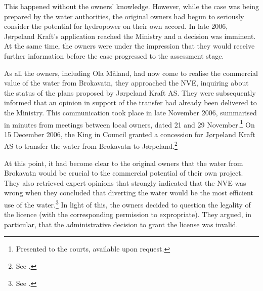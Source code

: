 This happened without the owners' knowledge. However, while the case was being prepared by the water authorities, the original owners had begun to seriously consider the potential for hydropower on their own accord. In late 2006, Jørpeland Kraft's application reached the Ministry and a decision was imminent. At the same time, the owners were under the impression that they would receive further information before the case progressed to the assessment stage.

As all the owners, including Ola Måland, had now come to realise the commercial value of the water from Brokavatn, they approached the NVE, inquiring about the status of the plans proposed by Jørpeland Kraft AS. They were subsequently informed that an opinion in support of the transfer had already been delivered to the Ministry. This communication took place in late November 2006, summarised in minutes from meetings between local owners, dated 21 and 29 November.\footnote{Presented to the courts, available upon request.} On 15 December 2006, the King in Council granted a concession for Jørpeland Kraft AS to transfer the water from Brokavatn to Jørpeland.\footnote{See \cite[3]{jorpeland09}.}

At this point, it had become clear to the original owners that the water from Brokavatn would be crucial to the commercial potential of their own project. They also retrieved expert opinions that strongly indicated that the NVE was wrong when they concluded that diverting the water would be the most efficient use of the water.\footnote{See \cite[23]{jorpeland09}.} In light of this, the owners decided to question the legality of the licence (with the corresponding permission to expropriate). They argued, in particular, that the administrative decision to grant the license was invalid.

